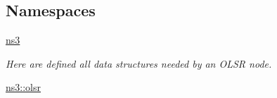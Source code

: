 \subsection*{Namespaces}
\begin{DoxyCompactItemize}
\item 
 \hyperlink{namespacens3}{ns3}
\begin{DoxyCompactList}\small\item\em Here are defined all data structures needed by an O\+L\+SR node. \end{DoxyCompactList}\item 
 \hyperlink{namespacens3_1_1olsr}{ns3\+::olsr}
\end{DoxyCompactItemize}
